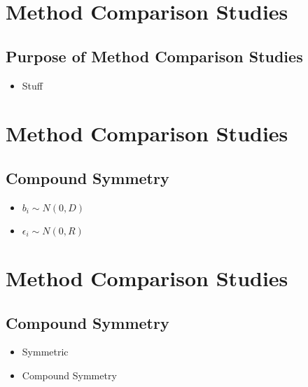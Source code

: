 \begin{frame}{\bf {}}
\begin{frame}{\bf {}}
\begin{itemize}
\section[Method Comparison Studies]{Method Comparison Studies}
\subsection{Purpose of Method Comparison Studies}
\begin{frame}{\bf {}}
\begin{itemize}\itemsep0.7cm
\item Stuff
\end{itemize}
\end{frame}

\section[Method Comparison Studies]{Method Comparison Studies}
\subsection{Compound Symmetry}
\begin{frame}{\bf {}}
\begin{itemize}\itemsep0.7cm
\item $b_i \sim N(0,D)$
\item $\epsilon_i \sim N(0,R)$
\end{itemize}
\end{frame}
\section[Method Comparison Studies]{Method Comparison Studies}
\subsection{Compound Symmetry}
\begin{frame}{\bf {}}
\begin{itemize}\itemsep0.7cm
\item Symmetric
\item Compound Symmetry
\end{itemize}
\end{frame}

\begin{frame}[fragile]{\bf {}}


\end{frame}
\end{itemize}
\end{frame}
\end{frame}
